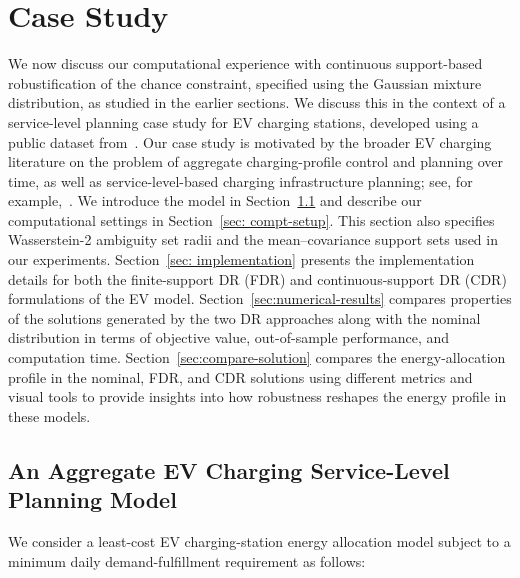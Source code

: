 \documentclass[opre,sglanonrev]{informs4}
\begin{document}
{\section{Case Study}
\label{sec:numerical}
We now discuss our computational experience with continuous support-based robustification of the chance constraint, specified using the Gaussian mixture distribution, as studied in the earlier sections. We discuss this in the context of a service-level planning case study for EV charging stations, developed using a public dataset from~\cite{evcharging2025figshare}.  Our case study is motivated by the broader EV charging literature on the problem of aggregate charging-profile control and planning over time, as well as service-level-based charging infrastructure planning; see, for example,~\cite{liu2022data, altaha2022aggregate}. We introduce the model in Section~\ref{sec: EV-model} and describe our computational settings in Section~\ref{sec: compt-setup}. This section also specifies Wasserstein-2 ambiguity set radii and the mean--covariance support sets used in our experiments. Section~\ref{sec: implementation} presents the implementation details for both the finite-support DR (FDR) and continuous-support DR (CDR) formulations of the EV model. Section~\ref{sec:numerical-results} compares properties of the solutions generated by the two DR approaches along with the nominal distribution in terms of objective value, out-of-sample performance, and computation time. Section~\ref{sec:compare-solution} compares the energy-allocation profile in the nominal, FDR, and CDR solutions using different metrics and visual tools to provide insights into how robustness reshapes the energy profile in these models.

\subsection{An Aggregate EV Charging Service-Level Planning Model}\label{sec: EV-model}

We consider a least-cost EV charging-station energy allocation model subject to a minimum daily demand-fulfillment requirement as follows:


}
\end{document}
